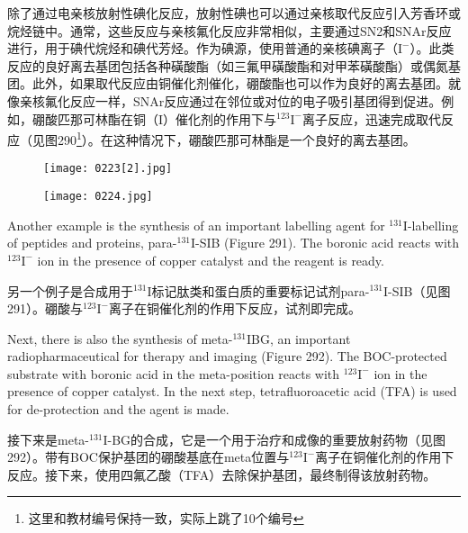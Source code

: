 \documentclass[dvipsnames, svgnames,a4paper,11pt]{article}
\begin{document}
除了通过电亲核放射性碘化反应，放射性碘也可以通过亲核取代反应引入芳香环或烷烃链中。通常，这些反应与亲核氟化反应非常相似，主要通过SN2和SNAr反应进行，用于碘代烷烃和碘代芳烃。作为碘源，使用普通的亲核碘离子（\(\mathrm{I^-}\)）。此类反应的良好离去基团包括各种磺酸酯（如三氟甲磺酸酯和对甲苯磺酸酯）或偶氮基团。此外，如果取代反应由铜催化剂催化，硼酸酯也可以作为良好的离去基团。就像亲核氟化反应一样，SNAr反应通过在邻位或对位的电子吸引基团得到促进。例如，硼酸匹那可林酯在铜（I）催化剂的作用下与\(\mathrm{^{123}I^-}\)离子反应，迅速完成取代反应（见图290\footnote{这里和教材编号保持一致，实际上跳了10个编号}）。在这种情况下，硼酸匹那可林酯是一个良好的离去基团。  

\begin{figure}[h]
	\centering
    \texttt{[image: 0223[2].jpg]}  
     \label{fig290}
\end{figure}

\begin{figure}[h]
	\centering
    \texttt{[image: 0224.jpg]}  
     \label{fig291}
\end{figure}


Another example is the synthesis of an important labelling agent for \(\mathrm{^{131}I}\)-labelling of peptides and proteins, para-\(\mathrm{^{131}I}\)-SIB (Figure 291). The boronic acid reacts with \(\mathrm{^{123}I^-}\) ion in the presence of copper catalyst and the reagent is ready.  

另一个例子是合成用于\(\mathrm{^{131}I}\)标记肽类和蛋白质的重要标记试剂para-\(\mathrm{^{131}I}\)-SIB（见图291）。硼酸与\(\mathrm{^{123}I^-}\)离子在铜催化剂的作用下反应，试剂即完成。  

Next, there is also the synthesis of meta-\(\mathrm{^{131}I}\)BG, an important radiopharmaceutical for therapy and imaging (Figure 292). The BOC-protected substrate with boronic acid in the meta-position reacts with \(\mathrm{^{123}I^-}\) ion in the presence of copper catalyst. In the next step, tetrafluoroacetic acid (TFA) is used for de-protection and the agent is made.  

接下来是meta-\(\mathrm{^{131}I}\)-BG的合成，它是一个用于治疗和成像的重要放射药物（见图292）。带有BOC保护基团的硼酸基底在meta位置与\(\mathrm{^{123}I^-}\)离子在铜催化剂的作用下反应。接下来，使用四氟乙酸（TFA）去除保护基团，最终制得该放射药物。  
\end{document}
